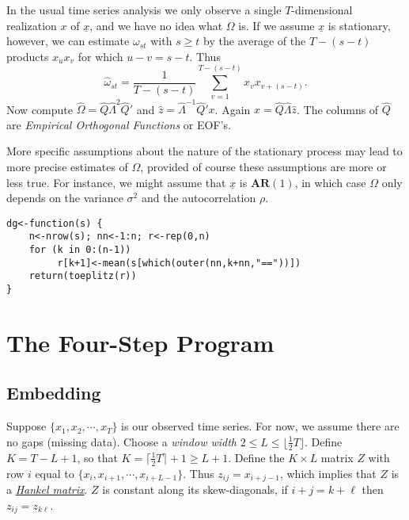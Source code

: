 \documentclass[11pt]{amsart}
\theoremstyle{plain}
\theoremstyle{definition}
\theoremstyle{remark}
\begin{document}
In the usual time series analysis we only observe a single \(T\)-dimensional realization \(x\) of \(\underline{x}\), and we have no idea what \(\Omega\) is. If we assume
\(\underline{x}\) is stationary, however, we can estimate \(\omega_{st}\) with \(s\geq t\) by the average of the \(T-(s-t)\) products \(x_ux_v\) for which \(u-v=s-t\). Thus
\[
\hat\omega_{st}=\frac{1}{T-(s-t)}\sum_{v=1}^{T-(s-t)} x_vx_{v+(s-t)}.
\]
Now compute \(\hat\Omega=\hat Q\hat\Lambda^2\hat Q'\) and \(\hat z=\hat\Lambda^{-1}\hat Q'x\). Again \(x=\hat Q\hat\Lambda\hat z\). The columns of
\(\hat Q\) are \emph{Empirical Orthogonal Functions} or EOF's. 

More specific assumptions about the nature of the stationary process may lead to
more precise estimates of \(\Omega\), provided of course these assumptions are more or less true. For instance, we might assume that \(\underline{x}\) is
\(\mathbf{AR}(1)\), in which case \(\Omega\) only depends on the variance \(\sigma^2\) and the autocorrelation \(\rho\).

\begin{lstlisting}
dg<-function(s) {
    n<-nrow(s); nn<-1:n; r<-rep(0,n)
    for (k in 0:(n-1))
         r[k+1]<-mean(s[which(outer(nn,k+nn,"=="))])
    return(toeplitz(r))
}
\end{lstlisting}


\section{The Four-Step Program}
\subsection{Embedding}
Suppose \(\{x_1,x_2,\cdots,x_T\}\) is our observed time series. For now, we assume there are no gaps (missing data). Choose a \emph{window width} \(2\leq L\leq\lfloor\frac12 T\rfloor\). Define \(K=T-L+1\), so that \(K=\lceil\frac12 T\rceil+1\geq L+1\). Define the \(K\times L\) matrix \(Z\) with row \(i\) equal to \(\{x_i,x_{i+1},\cdots,x_{i+L-1}\}\). Thus \(z_{ij}=x_{i+j-1}\), which implies that \(Z\) is a \href{http://en.wikipedia.org/wiki/Hankel_matrix}{\emph{Hankel matrix}}. \(Z\) is constant along its skew-diagonals, if \(i+j=k+\ell\) then \(z_{ij}=z_{k\ell}\).
\end{document}
